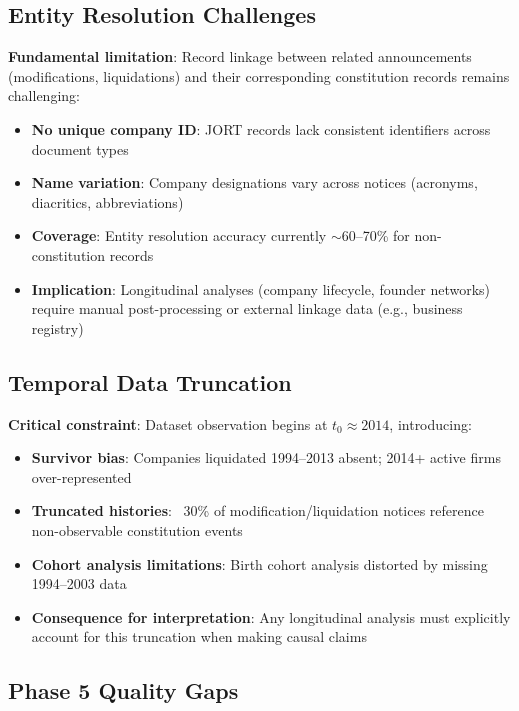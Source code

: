 \documentclass[12pt,a4paper]{report}
\begin{document}
\subsection{Entity Resolution Challenges}

\textbf{Fundamental limitation}: Record linkage between related announcements (modifications, liquidations) and their corresponding constitution records remains challenging:

\begin{itemize}
    \item \textbf{No unique company ID}: JORT records lack consistent identifiers across document types
    \item \textbf{Name variation}: Company designations vary across notices (acronyms, diacritics, abbreviations)
    \item \textbf{Coverage}: Entity resolution accuracy currently $\sim$60--70\% for non-constitution records
    \item \textbf{Implication}: Longitudinal analyses (company lifecycle, founder networks) require manual post-processing or external linkage data (e.g., business registry)
\end{itemize}

\subsection{Temporal Data Truncation}

\textbf{Critical constraint}: Dataset observation begins at $t_0 \approx 2014$, introducing:

\begin{itemize}
    \item \textbf{Survivor bias}: Companies liquidated 1994--2013 absent; 2014+ active firms over-represented
    \item \textbf{Truncated histories}: ~30\% of modification/liquidation notices reference non-observable constitution events
    \item \textbf{Cohort analysis limitations}: Birth cohort analysis distorted by missing 1994--2003 data
    \item \textbf{Consequence for interpretation}: Any longitudinal analysis must explicitly account for this truncation when making causal claims
\end{itemize}

\subsection{Phase 5 Quality Gaps}
\end{document}

